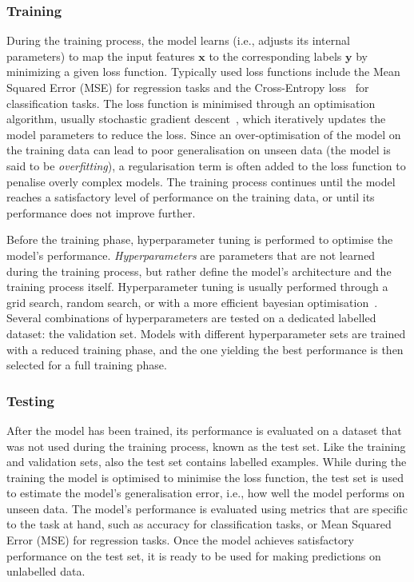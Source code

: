 \subsubsection{Training}
During the training process, the model learns (i.e., adjusts its internal parameters) to map the input features $\mathbf{x}$ to the corresponding labels $\mathbf{y}$ by minimizing a given loss function. Typically used loss functions include the Mean Squared Error (MSE) for regression tasks and the Cross-Entropy loss~\cite{mao2023cross} for classification tasks. The loss function is minimised through an optimisation algorithm, usually stochastic gradient descent~\cite{10.1214/aoms/1177729392}, which iteratively updates the model parameters to reduce the loss. Since an over-optimisation of the model on the training data can lead to poor generalisation on unseen data (the model is said to be \emph{overfitting}), a regularisation term is often added to the loss function to penalise overly complex models. The training process continues until the model reaches a satisfactory level of performance on the training data, or until its performance does not improve further. 

Before the training phase, hyperparameter tuning is performed to optimise the model's performance. \emph{Hyperparameters} are parameters that are not learned during the training process, but rather define the model's architecture and the training process itself. Hyperparameter tuning is usually performed through a grid search, random search, or with a more efficient bayesian optimisation~\cite{frazier2018tutorial,snoek2012practical,mockus2005bayesian}. Several combinations of hyperparameters are tested on a dedicated labelled dataset: the validation set. Models with different hyperparameter sets are trained with a reduced training phase, and the one yielding the best performance is then selected for a full training phase.


\subsubsection{Testing}
After the model has been trained, its performance is evaluated on a dataset that was not used during the training process, known as the test set. Like the training and validation sets, also the test set contains labelled examples. While during the training the model is optimised to minimise the loss function, the test set is used to estimate the model's generalisation error, i.e., how well the model performs on unseen data. The model's performance is evaluated using metrics that are specific to the task at hand, such as accuracy for classification tasks, or Mean Squared Error (MSE) for regression tasks. Once the model achieves satisfactory performance on the test set, it is ready to be used for making predictions on unlabelled data.


